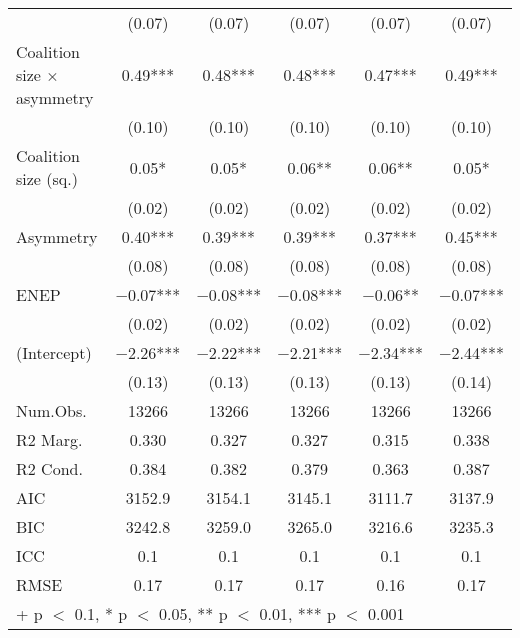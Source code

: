 \begin{table}
\begin{tabular}[t]{lccccc}
 & (\num{0.07}) & (\num{0.07}) & (\num{0.07}) & (\num{0.07}) & (\num{0.07})\\
Coalition size × asymmetry & \num{0.49}*** & \num{0.48}*** & \num{0.48}*** & \num{0.47}*** & \num{0.49}***\\
 & (\num{0.10}) & (\num{0.10}) & (\num{0.10}) & (\num{0.10}) & (\num{0.10})\\
Coalition size (sq.) & \num{0.05}* & \num{0.05}* & \num{0.06}** & \num{0.06}** & \num{0.05}*\\
 & (\num{0.02}) & (\num{0.02}) & (\num{0.02}) & (\num{0.02}) & \vphantom{1} (\num{0.02})\\
Asymmetry & \num{0.40}*** & \num{0.39}*** & \num{0.39}*** & \num{0.37}*** & \num{0.45}***\\
 & (\num{0.08}) & (\num{0.08}) & (\num{0.08}) & (\num{0.08}) & (\num{0.08})\\
ENEP & \num{-0.07}*** & \num{-0.08}*** & \num{-0.08}*** & \num{-0.06}** & \num{-0.07}***\\
 & (\num{0.02}) & (\num{0.02}) & (\num{0.02}) & (\num{0.02}) & (\num{0.02})\\
(Intercept) & \num{-2.26}*** & \num{-2.22}*** & \num{-2.21}*** & \num{-2.34}*** & \num{-2.44}***\\
 & (\num{0.13}) & (\num{0.13}) & (\num{0.13}) & (\num{0.13}) & (\num{0.14})\\
\midrule
Num.Obs. & \num{13266} & \num{13266} & \num{13266} & \num{13266} & \num{13266}\\
R2 Marg. & \num{0.330} & \num{0.327} & \num{0.327} & \num{0.315} & \num{0.338}\\
R2 Cond. & \num{0.384} & \num{0.382} & \num{0.379} & \num{0.363} & \num{0.387}\\
AIC & \num{3152.9} & \num{3154.1} & \num{3145.1} & \num{3111.7} & \num{3137.9}\\
BIC & \num{3242.8} & \num{3259.0} & \num{3265.0} & \num{3216.6} & \num{3235.3}\\
ICC & \num{0.1} & \num{0.1} & \num{0.1} & \num{0.1} & \num{0.1}\\
RMSE & \num{0.17} & \num{0.17} & \num{0.17} & \num{0.16} & \num{0.17}\\
\bottomrule
\multicolumn{6}{l}{\rule{0pt}{1em}+ p $<$ 0.1, * p $<$ 0.05, ** p $<$ 0.01, *** p $<$ 0.001}\\
\end{tabular}
\end{table}
